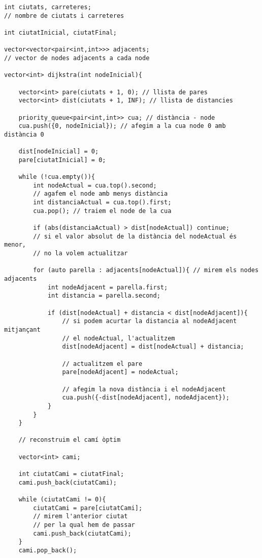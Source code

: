 \begin{lstlisting}
int ciutats, carreteres; 
// nombre de ciutats i carreteres

int ciutatInicial, ciutatFinal;

vector<vector<pair<int,int>>> adjacents;
// vector de nodes adjacents a cada node

vector<int> dijkstra(int nodeInicial){

    vector<int> pare(ciutats + 1, 0); // llista de pares
    vector<int> dist(ciutats + 1, INF); // llista de distancies

    priority_queue<pair<int,int>> cua; // distància - node
    cua.push({0, nodeInicial}); // afegim a la cua node 0 amb distància 0

    dist[nodeInicial] = 0;
    pare[ciutatInicial] = 0;

    while (!cua.empty()){
        int nodeActual = cua.top().second; 
        // agafem el node amb menys distància
        int distanciaActual = cua.top().first;
        cua.pop(); // traiem el node de la cua
        
        if (abs(distanciaActual) > dist[nodeActual]) continue;
        // si el valor absolut de la distància del nodeActual és menor,
        // no la volem actualitzar
        
        for (auto parella : adjacents[nodeActual]){ // mirem els nodes adjacents
            int nodeAdjacent = parella.first;
            int distancia = parella.second;
            
            if (dist[nodeActual] + distancia < dist[nodeAdjacent]){
                // si podem acurtar la distancia al nodeAdjacent mitjançant
                // el nodeActual, l'actualitzem
                dist[nodeAdjacent] = dist[nodeActual] + distancia;

                // actualitzem el pare
                pare[nodeAdjacent] = nodeActual;

                // afegim la nova distància i el nodeAdjacent
                cua.push({-dist[nodeAdjacent], nodeAdjacent});
            }
        }
    }
    
    // reconstruim el camí òptim

    vector<int> cami;

    int ciutatCami = ciutatFinal;
    cami.push_back(ciutatCami);

    while (ciutatCami != 0){
        ciutatCami = pare[ciutatCami];
        // mirem l'anterior ciutat 
        // per la qual hem de passar
        cami.push_back(ciutatCami);
    }
    cami.pop_back();


\end{lstlisting}

